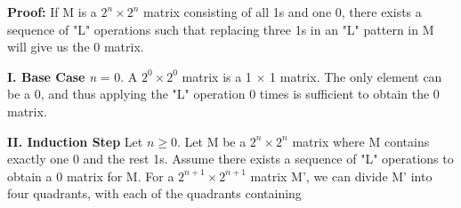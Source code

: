 \documentclass[11pt]{article}
\begin{document}
\begin{flushleft}
		\textbf{Proof:}\newline
		If M is a $2^n \times 2^n$ matrix consisting of all 1s and one 0, there exists a sequence of "L" operations such that replacing three 1s in an "L" pattern in M will give us the 0 matrix. \newline
		
		\textbf{I. Base Case}\newline
		\emph{n} = 0. A $2^0 \times 2^0$ matrix is a 1 $\times$ 1 matrix. The only element can be a 0, and thus applying the "L" operation 0 times is sufficient to obtain the 0 matrix.\newline 
		
		\textbf{II. Induction Step}
		Let $n \ge 0$. Let M be a $2^n \times 2^n$ matrix where M contains exactly one 0 and the rest 1s. Assume there exists a sequence of "L" operations to obtain a 0 matrix for M. For a $2^{n+1} \times 2^{n+1}$ matrix M', we can divide M' into four quadrants, with each of the quadrants containing 
		\vspace{0.2cm}
		
	\end{flushleft}
\end{document}
